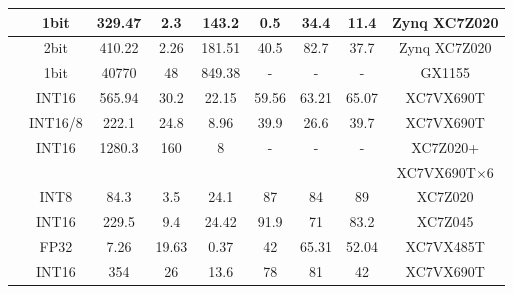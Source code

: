 \begin{table}[htbp]
\begin{tabular}{|r|c|c|c|c|c|c|c|c|}
            \cite{nakahara2017fully} & 1bit  & 329.47 & 2.3   & 143.2 & 0.5   & 34.4  & 11.4  & Zynq XC7Z020 \\ \hline
            \cite{jiao2017accelerating} & 2bit  & 410.22 & 2.26  & 181.51 & 40.5  & 82.7  & 37.7  & Zynq XC7Z020 \\ \hline
            \cite{moss2017high} & 1bit  & 40770 & 48    & 849.38 &   -   &   -   &   -   & GX1155 \\ \hline
            \cite{li2016high} & INT16 & 565.94 & 30.2  & 22.15 & 59.56 & 63.21 & 65.07 & XC7VX690T \\ \hline
            \cite{liu2016automatic} & INT16/8 & 222.1 & 24.8  & 8.96  & 39.9  & 26.6  & 39.7  & XC7VX690T \\ \hline
        \multicolumn{1}{|c|}{\multirow{2}[0]{*}{\cite{zhang2016energy}}} & \multirow{2}[0]{*}{INT16} & \multirow{2}[0]{*}{1280.3} & \multirow{2}[0]{*}{160} & \multirow{2}[0]{*}{8} & \multirow{2}[0]{*}{-} & \multirow{2}[0]{*}{-} & \multirow{2}[0]{*}{-} & XC7Z020+ \\
        \multicolumn{1}{|c|}{} &       &       &       &       &       &       &       & XC7VX690T$\times$6 \\ \hline
            \cite{guo2017angel} & INT8  & 84.3  & 3.5   & 24.1  & 87    & 84    & 89    & XC7Z020 \\ \hline
            \cite{xiao2017exploring} & INT16 & 229.5 & 9.4   & 24.42 & 91.9  & 71    & 83.2  & XC7Z045 \\ \hline
            \cite{guan2017fpga} & FP32  & 7.26  & 19.63 & 0.37  & 42    & 65.31 & 52.04 & XC7VX485T \\ \hline
            \cite{zhang2016caffeine} & INT16 & 354   & 26    & 13.6  & 78    & 81    & 42    & XC7VX690T \\ \hline
        \end{tabular}%
    \label{tab:hardware_list}%
  \end{table}%